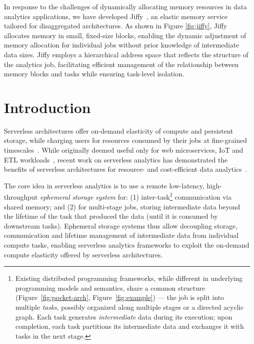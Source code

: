 In response to the challenges of dynamically allocating memory resources in data analytics applications, we have developed Jiffy~\cite{jiffy}, an elastic memory service tailored for disaggregated architectures. As shown in Figure \ref{fig:jiffy}, Jiffy allocates memory in small, fixed-size blocks, enabling the dynamic adjustment of memory allocation for individual jobs without prior knowledge of intermediate data sizes. Jiffy employs a hierarchical address space that reflects the structure of the analytics job, facilitating efficient management of the relationship between memory blocks and tasks while ensuring task-level isolation.


\section{Introduction}
\label{sec:intro}

Serverless architectures offer on-demand elasticity of compute and persistent storage, while charging users for resources consumed by their jobs at fine-grained timescales~\cite{alambda, azureFunctions, googlefunctions}. While originally deemed useful only for web microservices, IoT and ETL workloads~\cite{serverlesssurvey, serverlesssurvey2}, recent work on serverless analytics has demonstrated the benefits of serverless architectures for resource- and cost-efficient data analytics~\cite{starling, locus, pocket, flint, sparkonlambda, cirrus, excamera, pywren, numpywren, gg, athena, aurora, azuresqldw, cloudburst, snowset, caerus}. 

The core idea in serverless analytics is to use a remote low-latency, high-throughput {\em ephemeral storage system} for: (1) inter-task{\footnote{Existing distributed programming frameworks, while different in underlying programming models and semantics, share a common structure (Figure~\ref{fig:pocket-arch}, Figure~\ref{fig:example}) --- the job is split into multiple {\em tasks}, possibly organized along multiple stages or a directed acyclic graph. Each task generates {\em intermediate} data during its execution; upon completion, each task partitions its intermediate data and exchanges it with tasks in the next stage.}} communication via shared memory; and (2) for multi-stage jobs, storing intermediate data beyond the lifetime of the task that produced the data (until it is consumed by downstream tasks). Ephemeral storage systems thus allow decoupling storage, communication and lifetime management of intermediate data from individual compute tasks, enabling serverless analytics frameworks to exploit the on-demand compute elasticity offered by serverless architectures. 

